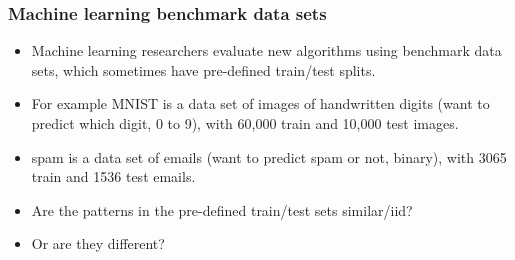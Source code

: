 \documentclass{beamer}
\begin{document}
\begin{frame}
  \frametitle{Machine learning benchmark data sets}
  \begin{itemize}
  \item Machine learning researchers evaluate new algorithms using
    benchmark data sets, which sometimes have pre-defined train/test
    splits.
  \item For example MNIST is a data set of images of handwritten
    digits (want to predict which digit, 0 to 9), with 60,000 train
    and 10,000 test images.
  \item spam is a data set of emails (want to predict spam or not,
    binary), with 3065 train and 1536 test emails.
  \item Are the patterns in the pre-defined train/test sets similar/iid? 
  \item Or are they different? 
  \end{itemize}
\end{frame}
\end{document}
